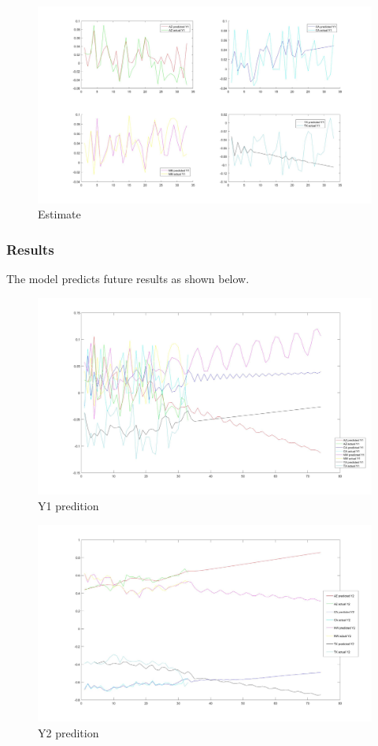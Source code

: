 \documentclass{mcmthesis}
\begin{document}
        \begin{figure}[!hbpt]
            \centering
            \includegraphics[width=450px]{estimate.jpg}
            \caption{Estimate}
        \end{figure}

    \subsubsection{Results}

        The model predicts future results as shown below.

        \begin{figure}[!hbpt]
          \centering
          \includegraphics[width=450px]{Y1.jpg}
          \caption{Y1 predition}
        \end{figure}

        \begin{figure}[!hbpt]
          \centering
          \includegraphics[width=450px]{Y2.jpg}
          \caption{Y2 predition}\label{1}
        \end{figure}
\end{document}
